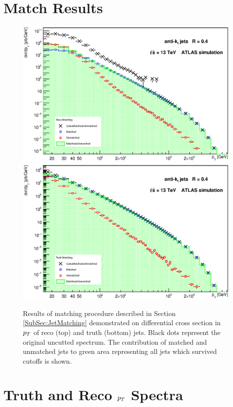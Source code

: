 \begin{appendices}
\section{Match Results}
\label{sec:MatchResults}

\begin{figure}[H]
  \centering
  \includegraphics[width=\textwidth]{Chapter3/SignalMatching.eps}
  \includegraphics[width=\textwidth]{Chapter3/TruthMatching.eps}
  \caption{Results of matching procedure described in Section
  \ref{SubSec:JetMatching} demonstrated on differential cross section in $p_{T}$ of
  reco (top) and truth (bottom) jets. Black dots represent the original
  uncutted spectrum. The contribution of matched and unmatched jets to
  green area representing all jets which survived cutoffs is shown.}
  \label{fig:Matching}
\end{figure}

\section{Truth and Reco $p_{T}$ Spectra}
\label{sec:TruthAndRecoSpectra}


\end{appendices}
